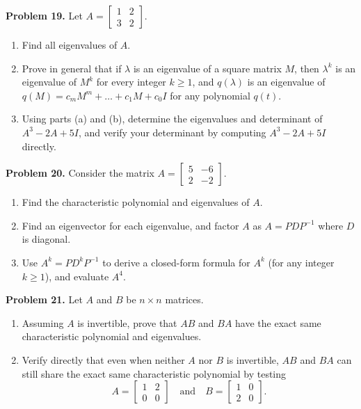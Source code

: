 \documentclass[11pt, letterpaper]{article}
\theoremstyle{definition}
\theoremstyle{remark}
\begin{document}
\noindent\textbf{Problem 19.} Let $A = \begin{bmatrix} 1 & 2 \\ 3 & 2 \end{bmatrix}$.
\begin{enumerate}[label=(\alph*), topsep=3pt, itemsep=3pt]
    \item Find all eigenvalues of $A$.
    \item Prove in general that if $\lambda$ is an eigenvalue of a square matrix $M$, then $\lambda^k$ is an eigenvalue of $M^k$ for every integer $k \ge 1$, and $q(\lambda)$ is an eigenvalue of $q(M) = c_m M^m + \dots + c_1 M + c_0 I$ for any polynomial $q(t)$.
    \item Using parts (a) and (b), determine the eigenvalues and determinant of $A^3 - 2A + 5I$, and verify your determinant by computing $A^3 - 2A + 5I$ directly.
\end{enumerate}

\noindent\textbf{Problem 20.} Consider the matrix $A = \begin{bmatrix} 5 & -6 \\ 2 & -2 \end{bmatrix}$.
\begin{enumerate}[label=(\alph*), topsep=3pt, itemsep=3pt]
    \item Find the characteristic polynomial and eigenvalues of $A$.
    \item Find an eigenvector for each eigenvalue, and factor $A$ as $A = PDP^{-1}$ where $D$ is diagonal.
    \item Use $A^k = PD^kP^{-1}$ to derive a closed-form formula for $A^k$ (for any integer $k \ge 1$), and evaluate $A^4$.
\end{enumerate}

\noindent\textbf{Problem 21.} Let $A$ and $B$ be $n \times n$ matrices.
\begin{enumerate}[label=(\alph*), topsep=3pt, itemsep=3pt]
    \item Assuming $A$ is invertible, prove that $AB$ and $BA$ have the exact same characteristic polynomial and eigenvalues.
    \item Verify directly that even when neither $A$ nor $B$ is invertible, $AB$ and $BA$ can still share the exact same characteristic polynomial by testing
    \[
    A = \begin{bmatrix} 1 & 2 \\ 0 & 0 \end{bmatrix} \quad \text{and} \quad B = \begin{bmatrix} 1 & 0 \\ 2 & 0 \end{bmatrix}.
    \]
\end{enumerate}
\end{document}

